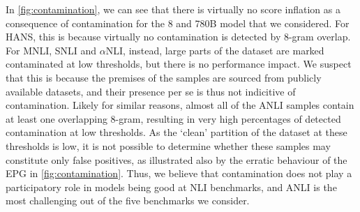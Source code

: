 
In \cref{fig:contamination}, we can see that there is virtually no score inflation as a consequence of contamination for the 8 and 780B model that we considered.
For HANS, this is because virtually no contamination is detected by 8-gram overlap.
For MNLI, SNLI and $\alpha$NLI, instead, large parts of the dataset are marked contaminated at low thresholds, but there is no performance impact.
We suspect that this is because the premises of the samples are sourced from publicly available datasets, and their presence per se is thus not indicitive of contamination.
Likely for similar reasons, almost all of the ANLI samples contain at least one overlapping 8-gram, resulting in very high percentages of detected contamination at low thresholds.
As the `clean' partition of the dataset at these thresholds is low, it is not possible to determine whether these samples may constitute only false positives, as illustrated also by the erratic behaviour of the EPG in \cref{fig:contamination}. 
% 
Thus, we believe that contamination does not play a participatory role in models being good at NLI benchmarks, and ANLI is the most challenging out of the five benchmarks we consider.
